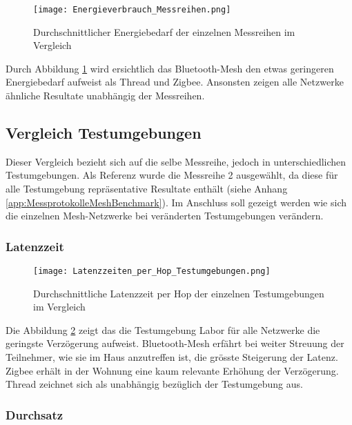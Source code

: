 \begin{figure}[H]
	\centering
	\texttt{[image: Energieverbrauch\_Messreihen.png]}
	\caption{Durchschnittlicher Energiebedarf der einzelnen Messreihen im Vergleich}\label{fig:EnergieverbrauchMessreihen}
\end{figure}

Durch Abbildung \ref{fig:EnergieverbrauchMessreihen} wird ersichtlich das Bluetooth-Mesh den etwas geringeren Energiebedarf aufweist als Thread und Zigbee. Ansonsten zeigen alle Netzwerke ähnliche Resultate unabhängig der Messreihen. 


\subsection{Vergleich Testumgebungen}\label{subsec:VergleichTestumgebungen}

Dieser Vergleich bezieht sich auf die selbe Messreihe, jedoch in unterschiedlichen Testumgebungen. Als Referenz wurde die Messreihe 2 ausgewählt, da diese für alle Testumgebung repräsentative Resultate enthält (siehe Anhang \ref{app:MessprotokolleMeshBenchmark}). Im Anschluss soll gezeigt werden wie sich die einzelnen Mesh-Netzwerke bei veränderten Testumgebungen verändern. \\

\subsubsection{Latenzzeit}\label{subsec:VergleichLatenzzeitTestumgebungen}


\begin{figure}[H]
	\centering
	\texttt{[image: Latenzzeiten\_per\_Hop\_Testumgebungen.png]}
	\caption{Durchschnittliche Latenzzeit per Hop der einzelnen Testumgebungen im Vergleich}\label{fig:Latenzzeiten_per_Hop_Testumgebungen}
\end{figure}

Die Abbildung \ref{fig:Latenzzeiten_per_Hop_Testumgebungen} zeigt das die Testumgebung Labor für alle Netzwerke die geringste Verzögerung aufweist. Bluetooth-Mesh erfährt bei weiter Streuung der Teilnehmer, wie sie im Haus anzutreffen ist, die grösste Steigerung der Latenz. Zigbee erhält in der Wohnung eine kaum relevante Erhöhung der Verzögerung. Thread zeichnet sich als unabhängig bezüglich der Testumgebung aus. 

\subsubsection{Durchsatz}\label{subsec:VergleichDurchsatzTestumgebungen}


